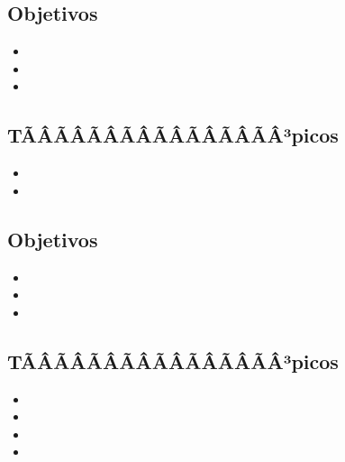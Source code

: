 \subsection*{Objetivos}
\begin{itemize}
	\item \ALNUEVEObjUNO
	\item \ALNUEVEObjDOS
	\item \ALNUEVEObjTRES
\end{itemize}

\subsection{\ALDIEZDef}\label{sec:BOK-AL10}

\subsection*{TÃÂÃÂÃÂÃÂÃÂÃÂÃÂÃÂ³picos}
\begin{itemize}
	\item \ALDIEZTopicSegmentos
	\item \ALDIEZTopicAlgoritmos
\end{itemize}

\subsection*{Objetivos}
\begin{itemize}
	\item \ALDIEZObjUNO
	\item \ALDIEZObjDOS
	\item \ALDIEZObjTRES
\end{itemize}

\subsection{\ALONCEDef}\label{sec:BOK-AL11}

\subsection*{TÃÂÃÂÃÂÃÂÃÂÃÂÃÂÃÂ³picos}
\begin{itemize}
	\item \ALONCETopicEl
	\item \ALONCETopicLecturas
	\item \ALONCETopicSalto
	\item \ALONCETopicElteorema
\end{itemize}

